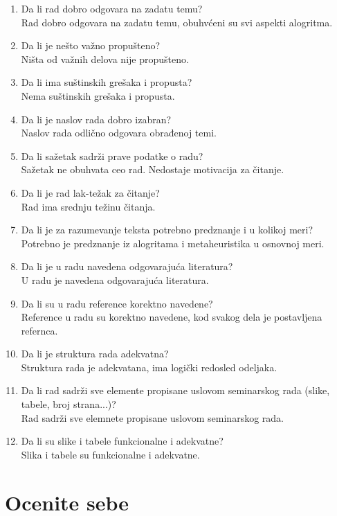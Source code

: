 \documentclass[a4paper]{report}
\begin{document}
\begin{enumerate}
\item Da li rad dobro odgovara na zadatu temu?\\
Rad dobro odgovara na zadatu temu, obuhvćeni su svi aspekti alogritma.
\item Da li je nešto važno propušteno?\\
Ništa od važnih delova nije propušteno.
\item Da li ima suštinskih grešaka i propusta?\\
Nema suštinskih grešaka i propusta.
\item Da li je naslov rada dobro izabran?\\
Naslov rada odlično odgovara obrađenoj temi.
\item Da li sažetak sadrži prave podatke o radu?\\
Sažetak ne obuhvata ceo rad. Nedostaje motivacija za čitanje.
\item Da li je rad lak-težak za čitanje?\\
Rad ima srednju težinu čitanja.
\item Da li je za razumevanje teksta potrebno predznanje i u kolikoj meri?\\
Potrebno je predznanje iz alogritama i metaheuristika u osnovnoj meri.
\item Da li je u radu navedena odgovarajuća literatura?\\
U radu je navedena odgovarajuća literatura.
\item Da li su u radu reference korektno navedene?\\
Reference u radu su korektno navedene, kod svakog dela je postavljena refernca.
\item Da li je struktura rada adekvatna?\\
Struktura rada je adekvatana, ima logički redosled odeljaka.
\item Da li rad sadrži sve elemente propisane uslovom seminarskog rada (slike, tabele, broj strana...)?\\
Rad sadrži sve elemnete propisane uslovom seminarskog rada.
\item Da li su slike i tabele funkcionalne i adekvatne?\\
Slika i tabele su funkcionalne i adekvatne.
\end{enumerate}


\section{Ocenite sebe}
\end{document}

